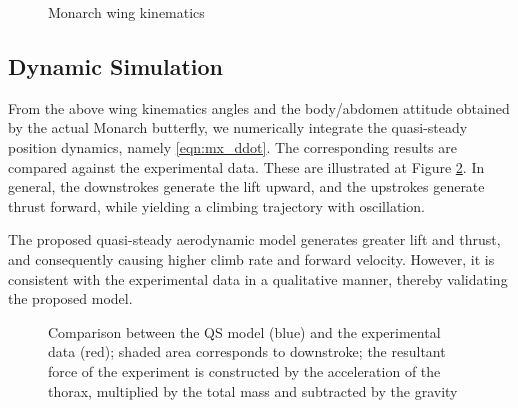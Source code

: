 \documentclass[conf]{new-aiaa}
\begin{document}
\begin{figure}
    \centerline{
        \hfill
    }
    \caption{Monarch wing kinematics}\label{fig:Monarch_WK}
\end{figure}

\subsection{Dynamic Simulation}

From the above wing kinematics angles and the body/abdomen attitude obtained by the actual Monarch butterfly,
we numerically integrate the quasi-steady position dynamics, namely \eqref{eqn:mx_ddot}.
The corresponding results are compared against the experimental data. 
These are illustrated at Figure \ref{fig:comp_VICON}.
In general, the downstrokes generate the lift upward, and the upstrokes generate thrust forward,
while yielding a climbing trajectory with oscillation.

The proposed quasi-steady aerodynamic model generates greater lift and thrust, and consequently causing higher climb rate and forward velocity. 
However, it is consistent with the experimental data in a qualitative manner, thereby validating the proposed model. 


\begin{figure}[p]
    \centerline{
        \hfill
    }
    \centerline{
        \hfill
    }
    \centerline{
        \hfill
    }
    \caption{Comparison between the QS model (blue) and the experimental data (red); shaded area corresponds to downstroke; the resultant force of the experiment is constructed by the acceleration of the thorax, multiplied by the total mass and subtracted by the gravity}\label{fig:comp_VICON}
\end{figure}
\end{document}
